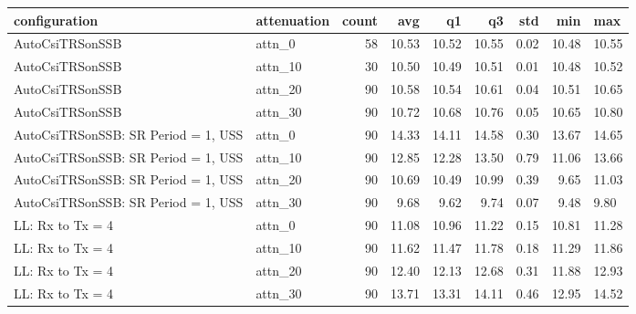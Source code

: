 \begin{tabular}{|l|l|r|r|r|r|r|r|}
\toprule
configuration & attenuation & count & avg & q1 & q3 & std & min & max \\
\midrule
AutoCsiTRSonSSB & attn_0 & 58 & 10.53 & 10.52 & 10.55 & 0.02 & 10.48 & 10.55 \\
AutoCsiTRSonSSB & attn_10 & 30 & 10.50 & 10.49 & 10.51 & 0.01 & 10.48 & 10.52 \\
AutoCsiTRSonSSB & attn_20 & 90 & 10.58 & 10.54 & 10.61 & 0.04 & 10.51 & 10.65 \\
AutoCsiTRSonSSB & attn_30 & 90 & 10.72 & 10.68 & 10.76 & 0.05 & 10.65 & 10.80 \\
AutoCsiTRSonSSB: SR Period = 1, USS & attn_0 & 90 & 14.33 & 14.11 & 14.58 & 0.30 & 13.67 & 14.65 \\
AutoCsiTRSonSSB: SR Period = 1, USS & attn_10 & 90 & 12.85 & 12.28 & 13.50 & 0.79 & 11.06 & 13.66 \\
AutoCsiTRSonSSB: SR Period = 1, USS & attn_20 & 90 & 10.69 & 10.49 & 10.99 & 0.39 & 9.65 & 11.03 \\
AutoCsiTRSonSSB: SR Period = 1, USS & attn_30 & 90 & 9.68 & 9.62 & 9.74 & 0.07 & 9.48 & 9.80 \\
LL: Rx to Tx = 4 & attn_0 & 90 & 11.08 & 10.96 & 11.22 & 0.15 & 10.81 & 11.28 \\
LL: Rx to Tx = 4 & attn_10 & 90 & 11.62 & 11.47 & 11.78 & 0.18 & 11.29 & 11.86 \\
LL: Rx to Tx = 4 & attn_20 & 90 & 12.40 & 12.13 & 12.68 & 0.31 & 11.88 & 12.93 \\
LL: Rx to Tx = 4 & attn_30 & 90 & 13.71 & 13.31 & 14.11 & 0.46 & 12.95 & 14.52 \\
\bottomrule
\end{tabular}
